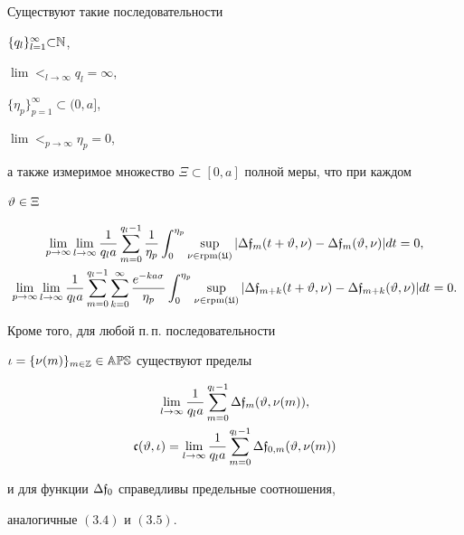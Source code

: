 \begin{lems}


Существуют такие последовательности


$\{q_{l}\}_{l=1}^{\infty}{\subset}\Bbb N$,


$\lim\lt_{l\to\infty}q_{l}{=}\infty$,


$\{\eta_{p}\}_{p=1}^{\infty}{\subset}(0,a]$,


$\lim\lt_{p\to\infty}\eta_{p}=0$,


а также измеримое множество $\Xi\subset[0,a]$ полной меры, что при каждом


$\vartheta\in\Xi$


\begin{gather}


\lim_{p\to\infty}\lim_{l\to\infty}\frac{1}{q_{l}a}


\sum_{m=0}^{q_{l}-1}\frac{1}{\eta_{p}}\int_{0}^{\eta_{p}}


\sup_{\nu\in \rpm(\gU)}


|\Dl{\frak{f}}_{m}(t+\vt,\nu)-\Dl{\frak{f}}_{m}(\vt,\nu)|dt=0,\\


%


\lim_{p\to\infty}\lim_{l\to\infty}\frac{1}{q_{l}a}


\sum_{m=0}^{q_{l}-1}\sum_{k=0}^{\infty}


\frac{e^{-ka\sigma}}{\eta_{p}}\int_{0}^{\eta_{p}}


\sup_{\nu\in \rpm(\gU)}


|\Dl{\frak{f}}_{m+k}(t+\vt,\nu)-\Dl{\frak{f}}_{m+k}(\vt,\nu)|dt=0.


\end{gather}


Кроме того, для любой п.\,п. последовательности


$\iota=\{\nu(m)\}_{m\in\Bbb Z}\in\Bbb{APS}$ существуют пределы


\begin{gather}


\lim_{l\to\infty}\frac{1}{q_{l}a}\sum_{m=0}^{q_{l}-1}


\Dl{\frak{f}}_{m}(\vt,\nu(m)), \\


\frak c(\vt,\iota)=\lim_{l\to\infty}\frac{1}{q_{l}a}\sum_{m=0}^{q_{l}-1}


\Dl{\frak{f}}_{0,m}(\vt,\nu(m))


\end{gather}


и для функции $\Delta{\frak{f}}_{0}$ справедливы предельные соотношения,


аналогичные $(3.4)$ и $(3.5)$.


\end{lems}






